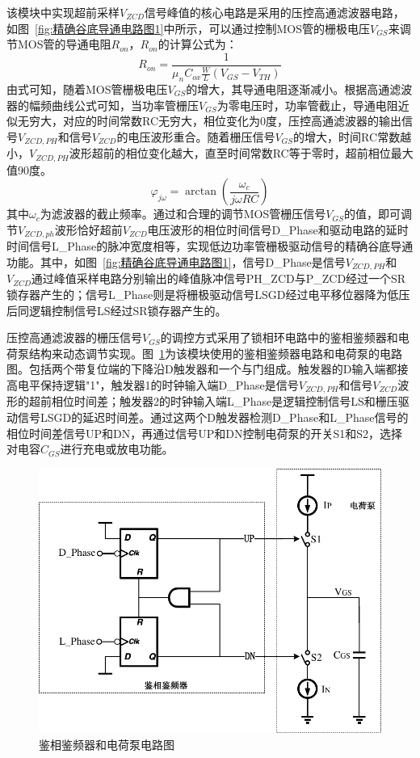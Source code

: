 该模块中实现超前采样$V_{ZCD}$信号峰值的核心电路是采用的压控高通滤波器电路，如图~\ref{fig:精确谷底导通电路图1}中所示，可以通过控制MOS管的栅极电压$V_{GS}$来调节MOS管的导通电阻$R_{on}$，$R_{on}$的计算公式为：
\begin{equation}
    \label{eq:Ron公式}
    R_{on}=\frac{1}{\mu_n C_{ox} \frac{W}{L} (V_{GS} - V_{TH})}
\end{equation}
由式可知，随着MOS管栅极电压$V_{GS}$的增大，其导通电阻逐渐减小。根据高通滤波器的幅频曲线公式可知，当功率管栅压$V_{GS}$为零电压时，功率管截止，导通电阻近似无穷大，对应的时间常数RC无穷大，相位变化为0度，压控高通滤波器的输出信号$V_{ZCD,PH}$和信号$V_{ZCD}$的电压波形重合。随着栅压信号$V_{GS}$的增大，时间RC常数越小，$V_{ZCD,PH}$波形超前的相位变化越大，直至时间常数RC等于零时，超前相位最大值90度。
\begin{equation}
    \label{eq:jw公式}
    \varphi_{j\omega }=\arctan (\frac{\omega_c}{j\omega R C })
\end{equation}
其中$\omega_c$为滤波器的截止频率。通过和合理的调节MOS管栅压信号$V_{GS}$的值，即可调节$V_{ZCD,ph}$波形恰好超前$V_{ZCD}$电压波形的相位时间信号D\_Phase和驱动电路的延时时间信号L\_Phase的脉冲宽度相等，实现低边功率管栅极驱动信号的精确谷底导通功能。其中，如图~\ref{fig:精确谷底导通电路图1}，信号D\_Phase是信号$V_{ZCD,PH}$和$V_{ZCD}$通过峰值采样电路分别输出的峰值脉冲信号PH\_ZCD与P\_ZCD经过一个SR锁存器产生的；信号L\_Phase则是将栅极驱动信号LSGD经过电平移位器降为低压后同逻辑控制信号LS经过SR锁存器产生的。

压控高通滤波器的栅压信号$V_{GS}$的调控方式采用了锁相环电路中的鉴相鉴频器和电荷泵结构来动态调节实现。图~\ref{fig:鉴相鉴频器电路图}为该模块使用的鉴相鉴频器电路和电荷泵的电路图。包括两个带复位端的下降沿D触发器和一个与门组成。触发器的D输入端都接高电平保持逻辑"1"，触发器1的时钟输入端D\_Phase是信号$V_{ZCD,PH}$和信号$V_{ZCD}$波形的超前相位时间差；触发器2的时钟输入端L\_Phase是逻辑控制信号LS和栅压驱动信号LSGD的延迟时间差。通过这两个D触发器检测D\_Phase和L\_Phase信号的相位时间差信号UP和DN，再通过信号UP和DN控制电荷泵的开关S1和S2，选择对电容$C_{GS}$进行充电或放电功能。

\begin{figure}[htbp] 
    \centering
    \includegraphics[width=0.6\linewidth]{figures/鉴相鉴频器.pdf}
    \caption{鉴相鉴频器和电荷泵电路图}
    \label{fig:鉴相鉴频器电路图}
\end{figure}

